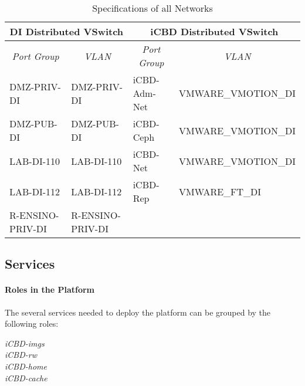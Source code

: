 \begin{table}[]
\centering
\begin{tabular}{ll|ll}
\multicolumn{2}{c|}{\textbf{DI Distributed VSwitch}} & \multicolumn{2}{c}{\textbf{iCBD Distributed VSwitch}} \\ \hline
\multicolumn{1}{c}{\textit{Port Group}} & \multicolumn{1}{c|}{\textit{VLAN}} & \multicolumn{1}{c}{\textit{Port Group}} & \multicolumn{1}{c}{\textit{VLAN}} \\
DMZ-PRIV-DI & DMZ-PRIV-DI & iCBD-Adm-Net & VMWARE\_VMOTION\_DI \\
DMZ-PUB-DI & DMZ-PUB-DI & iCBD-Ceph & VMWARE\_VMOTION\_DI \\
LAB-DI-110 & LAB-DI-110 & iCBD-Net & VMWARE\_VMOTION\_DI \\
LAB-DI-112 & LAB-DI-112 & iCBD-Rep & VMWARE\_FT\_DI \\
R-ENSINO-PRIV-DI & R-ENSINO-PRIV-DI &  & 
\end{tabular}
\caption{Specifications of all Networks}
\label{tab:impl_dvs}
\end{table}


\subsection{Services}
\label{sub:impl_cache_services}

\paragraph{Roles in the Platform}
\label{par:impl_roles}

The several services needed to deploy the platform can be grouped by the following roles:

\begin{description}
	\item [\textit{iCBD-imgs}]
	\item [\textit{iCBD-rw}]
	\item [\textit{iCBD-home}]
	\item [\textit{iCBD-cache}]
\end{description}

